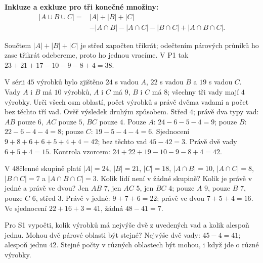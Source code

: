 \documentclass[11pt,a4paper]{article}
\begin{document}
\begin{definiceBox}[title={Věta - Princip inkluze a exkluze pro tři množiny}]
\textbf{Inkluze a exkluze pro tři konečné množiny:}
\[
\begin{aligned}
|A\cup B\cup C|={}&|A|+|B|+|C|\\
&-|A\cap B|-|A\cap C|-|B\cap C|+|A\cap B\cap C|.
\end{aligned}
\]
\end{definiceBox}
Součtem $|A|+|B|+|C|$ je střed započten třikrát; odečtením
párových průniků ho zase třikrát odebereme, proto ho jednou vracíme.
V P1 tak $23+21+17-10-9-8+4=38$.

\begin{zadaniReseniBox}[title={Samostatná práce 1}]
V sérii $45$ výrobků bylo zjištěno $24$ s vadou $A$, $22$ s vadou $B$
a $19$ s vadou $C$. Vady $A$ i $B$ má $10$ výrobků,
$A$ i $C$ má $9$, $B$ i $C$ má $8$; všechny tři vady mají $4$ výrobky.
Urči všech osm oblastí, počet výrobků s právě dvěma vadami a počet
bez těchto tří vad. Ověř výsledek druhým způsobem.
\tcblower
Střed $4$; právě dva typy vad: $AB$ pouze $6$, $AC$ pouze $5$,
$BC$ pouze $4$. Pouze $A$: $24-6-5-4=9$;
pouze $B$: $22-6-4-4=8$; pouze $C$: $19-5-4-4=6$.
Sjednocení $9+8+6+6+5+4+4=42$; bez těchto vad $45-42=3$.
Právě dvě vady $6+5+4=15$.
Kontrola vzorcem: $24+22+19-10-9-8+4=42$.
\end{zadaniReseniBox}

\begin{zadaniReseniBox}[title={Samostatná práce 2},breakable=false]
V $48$členné skupině platí $|A|=24$, $|B|=21$, $|C|=18$,
$|A\cap B|=10$, $|A\cap C|=8$, $|B\cap C|=7$
a $|A\cap B\cap C|=3$. Kolik lidí není v žádné skupině?
Kolik je právě v jedné a právě ve dvou?
\tcblower
Jen $AB$ $7$, jen $AC$ $5$, jen $BC$ $4$; pouze $A$ $9$,
pouze $B$ $7$, pouze $C$ $6$, střed $3$.
Právě v jedné: $9+7+6=22$; právě ve dvou $7+5+4=16$.
Ve sjednocení $22+16+3=41$, žádná $48-41=7$.
\end{zadaniReseniBox}

\begin{zadaniReseniBox}[title={Rozšíření 1},breakable=false]
Pro S1 vypočti, kolik výrobků má nejvýše dvě z uvedených vad
a kolik alespoň jednu. Mohou dvě párové oblasti být stejné?
\tcblower
Nejvýše dvě vady: $45-4=41$; alespoň jednu $42$.
Stejné počty v různých oblastech být mohou, i když jde o různé výrobky.
\end{zadaniReseniBox}
\end{document}
